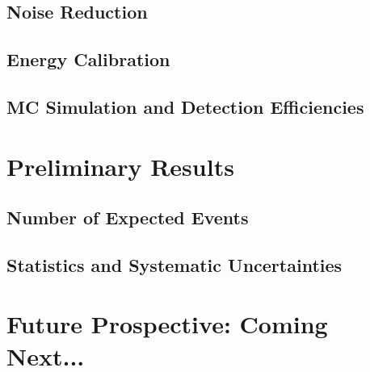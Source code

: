 \documentclass[12pt,twoside,letterpaper]{article}
\begin{document}
\subsection{Noise Reduction} 

\subsection{Energy Calibration} 

\subsection{MC Simulation and Detection Efficiencies} 

\section{Preliminary Results} 

\subsection{Number of Expected Events} 

\subsection{Statistics and Systematic Uncertainties} 

\section{Future Prospective: Coming Next...} 
\end{document}
